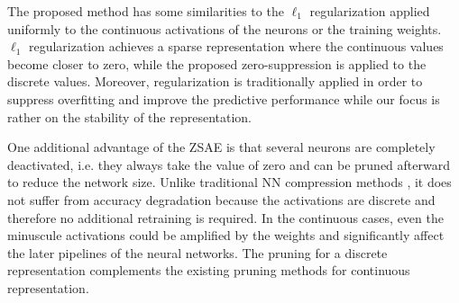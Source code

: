 The proposed method has some similarities to the $\ell_1$ regularization
applied uniformly to the continuous activations of the neurons or the training weights.
$\ell_1$ regularization achieves a sparse representation where the continuous values become closer to zero,
while the proposed zero-suppression is applied to the discrete values.
% 
Moreover, regularization is traditionally applied in order to suppress overfitting and improve the predictive performance
while our focus is rather on the stability of the representation.
% 



One additional advantage of the ZSAE is that
several neurons are completely deactivated, i.e. they always take the value of zero
and can be pruned afterward to reduce the network size.
Unlike traditional NN compression methods \cite{cheng2017survey}, it does not suffer from
accuracy degradation because the activations are discrete and therefore no additional retraining is required.
In the continuous cases, even the minuscule activations could be amplified by the weights and significantly affect the
later pipelines of the neural networks.
The pruning for a discrete representation complements the existing pruning methods for continuous representation.

